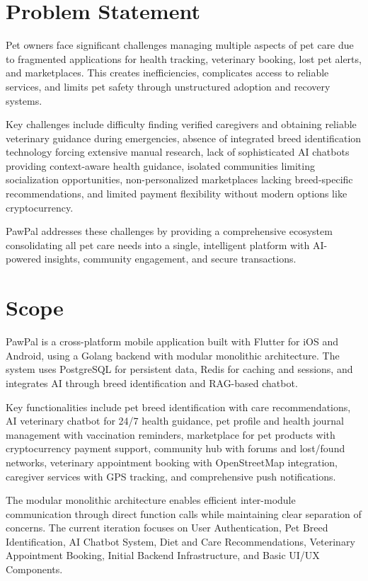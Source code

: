 \section{Problem Statement}

Pet owners face significant challenges managing multiple aspects of pet care due to fragmented applications for health tracking, veterinary booking, lost pet alerts, and marketplaces. This creates inefficiencies, complicates access to reliable services, and limits pet safety through unstructured adoption and recovery systems.

Key challenges include difficulty finding verified caregivers and obtaining reliable veterinary guidance during emergencies, absence of integrated breed identification technology forcing extensive manual research, lack of sophisticated AI chatbots providing context-aware health guidance, isolated communities limiting socialization opportunities, non-personalized marketplaces lacking breed-specific recommendations, and limited payment flexibility without modern options like cryptocurrency.

PawPal addresses these challenges by providing a comprehensive ecosystem consolidating all pet care needs into a single, intelligent platform with AI-powered insights, community engagement, and secure transactions.

\section{Scope}

PawPal is a cross-platform mobile application built with Flutter for iOS and Android, using a Golang backend with modular monolithic architecture. The system uses PostgreSQL for persistent data, Redis for caching and sessions, and integrates AI through breed identification and RAG-based chatbot.

Key functionalities include pet breed identification with care recommendations, AI veterinary chatbot for 24/7 health guidance, pet profile and health journal management with vaccination reminders, marketplace for pet products with cryptocurrency payment support, community hub with forums and lost/found networks, veterinary appointment booking with OpenStreetMap integration, caregiver services with GPS tracking, and comprehensive push notifications.

The modular monolithic architecture enables efficient inter-module communication through direct function calls while maintaining clear separation of concerns. The current iteration focuses on User Authentication, Pet Breed Identification, AI Chatbot System, Diet and Care Recommendations, Veterinary Appointment Booking, Initial Backend Infrastructure, and Basic UI/UX Components.

